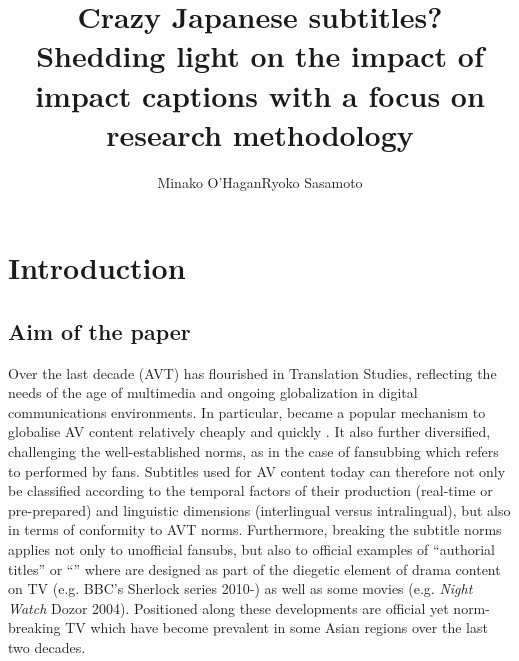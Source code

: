 \documentclass[output=paper]{langsci/langscibook}
\title{Crazy {Japanese} subtitles? {S}hedding light on the impact of impact captions with a focus on research methodology}
\author{Minako O'Hagan\affiliation{University of Auckland}\lastand Ryoko Sasamoto\affiliation{Dublin City University}
}
\begin{document}
 
\section{Introduction}

\subsection{Aim of the paper}

Over the last decade  (AVT) has flourished in Translation Studies, reflecting the needs of the age of multimedia and ongoing globalization in digital communications environments. In particular,  became a popular mechanism to globalise AV content relatively cheaply and quickly \citep[274]{diaz2013}. It also further diversified, challenging the well-established  norms, as in the case of fansubbing which refers to  performed by fans. Subtitles used for AV content today can therefore not only be classified according to the temporal factors of their production (real-time or pre-prepared) and linguistic dimensions (interlingual versus intralingual), but also in terms of conformity to AVT norms.   Furthermore, breaking the subtitle norms applies not only to unofficial fansubs, but also to official examples of ``authorial titles'' \citep{perezgonzalez2012} or ``'' \citep{Fox2013} where  are designed as part of the diegetic element of drama content on TV (e.g. BBC's Sherlock series 2010-) as well as some movies (e.g. \textit{Night Watch} Dozor 2004). Positioned along these developments are official yet norm-breaking TV  which have become prevalent in some Asian regions over the last two decades.   
\end{document}
